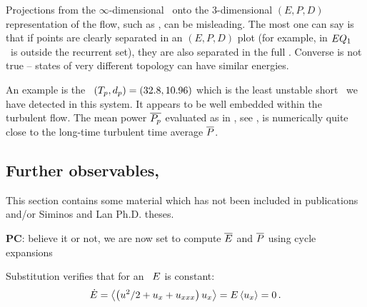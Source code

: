 Projections from the $\infty$-dimensional \statesp\ onto the 3-dimensional
$(E,P,D)$ representation of the flow, such as
, can be misleading.
The most one can say is that if points are clearly separated in an
$(E,P,D)$ plot (for example, in 
$EQ_{1}$ \eqv\ is outside the recurrent set), they are also separated
in the full \statesp.  Converse is not true -- states of
very different topology can have similar energies.

An example is the \rpo\ $({T_{p}},d_p) = (32.8,10.96)$
which {is the least unstable short \rpo\ we have detected in this system.
It} appears to be well embedded within the turbulent flow. The mean power
$\overline{P_p}$ evaluated as in , see ,
is numerically quite close to the long-time turbulent time average
$\overline{P}$.

\subsection{Further observables, \KS}
\label{sec:moreObs}

                                                    \toCB
This section contains some material which has not been included in
publications and/or Siminos and Lan Ph.D. theses.

{\bf PC}: believe it or not, we are now set to compute
    $\overline{E}$ and $\overline{P}$
    using cycle expansions

Substitution %
verifies that for an \eqv\ $E$ is constant:
\[
   \dot{E} =
\left\langle { \left({u^2}/{2} + u_{x} + u_{xxx} \right) u_x} \right\rangle
    = E \left\langle { u_x } \right\rangle=0
    \,.
\]


